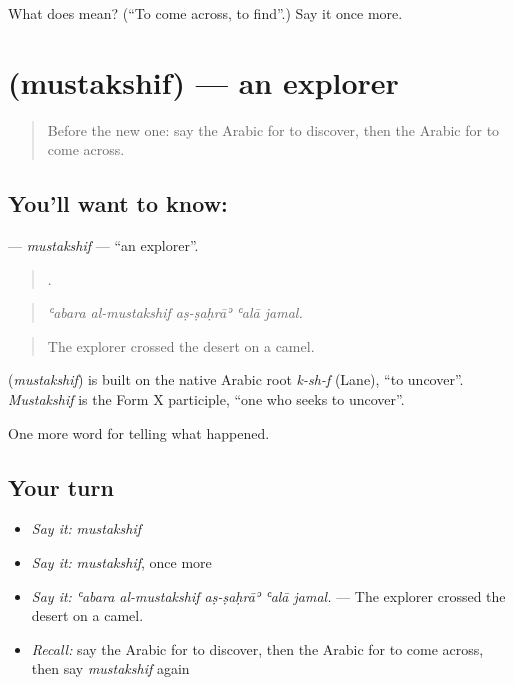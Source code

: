 \begin{tcolorbox}[breakable,colback=teal!4,colframe=teal!35!black,title={Before you move on}]
What does  mean? (\textquotedblleft{}To come across, to find\textquotedblright{}.) Say it once more.
\end{tcolorbox}
\section[\texorpdfstring{\ar{مستكشف} (mustakshif)}{مستكشف (mustakshif)}]{ (mustakshif) — an explorer}

\label{lesson:AR-C312-mustakshif}



\begin{quote}
Before the new one: say the Arabic for to discover, then the Arabic for to come across.
\end{quote}

\subsection*{You'll want to know: }
\textbf{} — \emph{mustakshif} — \textquotedblleft{}an explorer\textquotedblright{}.

\begin{quote}
    .
\end{quote}

\begin{quote}
\emph{ʿabara al-mustakshif aṣ-ṣaḥrāʾ ʿalā jamal.}
\end{quote}

\begin{quote}
The explorer crossed the desert on a camel.
\end{quote}

\begin{cousinweb}
\textbf{} (\emph{mustakshif}) is built on the native Arabic root \emph{k-sh-f} (Lane), \textquotedblleft{}to uncover\textquotedblright{}. \emph{Mustakshif} is the Form X participle, \textquotedblleft{}one who seeks to uncover\textquotedblright{}.
\end{cousinweb}

\begin{grammarlens}[title={What you've built}]
One more word for telling what happened.
\end{grammarlens}

\subsection*{Your turn}
\begin{itemize}
\raggedright
  \item \emph{Say it:} \emph{mustakshif}
  \item \emph{Say it:} \emph{mustakshif}, once more
  \item \emph{Say it:} \emph{ʿabara al-mustakshif aṣ-ṣaḥrāʾ ʿalā jamal.} — The explorer crossed the desert on a camel.
  \item \emph{Recall:} say the Arabic for to discover, then the Arabic for to come across, then say \emph{mustakshif} again
\end{itemize}

